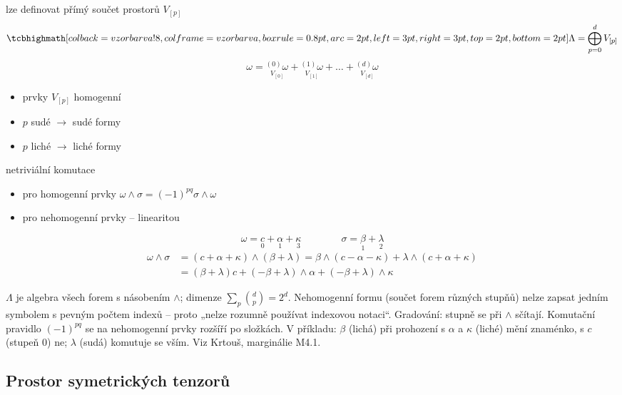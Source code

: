 lze definovat přímý součet prostorů $V_{[p]}$
\[
  \vzorec{\Lambda = \bigoplus_{p=0}^d V_{[p]}}
\]
\[
  \omega = \underset{V_{[0]}}{{}^{(0)}\omega} + \underset{V_{[1]}}{{}^{(1)}\omega} + \dots + \underset{V_{[d]}}{{}^{(d)}\omega}
\]

\begin{itemize}[nosep]
  \item[] prvky $V_{[p]}$ homogenní
  \item[] $p$ sudé $\to$ sudé formy
  \item[] $p$ liché $\to$ liché formy
\end{itemize}
netriviální komutace
\begin{itemize}[nosep]
  \item[] pro homogenní prvky \quad $\omega\wedge\sigma = (-1)^{pq}\sigma\wedge\omega$
  \item[] pro nehomogenní prvky -- linearitou
\end{itemize}

\begin{priklad}[Př.]
\[
  \omega = \underset{0}{c} + \underset{1}{\alpha} + \underset{3}{\kappa} \qquad\qquad
  \sigma = \underset{1}{\beta} + \underset{2}{\lambda}
\]
\begin{align*}
  \omega\wedge\sigma &= (c + \alpha + \kappa)\wedge(\beta + \lambda) = \beta\wedge(c - \alpha - \kappa) + \lambda\wedge(c + \alpha + \kappa) \\
  &= (\beta + \lambda)c + (-\beta + \lambda)\wedge\alpha + (-\beta + \lambda)\wedge\kappa
\end{align*}
\end{priklad}

\begin{vysvetleni}
$\Lambda$ je algebra všech forem s násobením $\wedge$; dimenze $\sum_p\binom dp=2^d$. Nehomogenní formu (součet forem různých stupňů) nelze zapsat jedním symbolem s pevným počtem indexů -- proto „nelze rozumně používat indexovou notaci“.
Gradování: stupně se při $\wedge$ sčítají. Komutační pravidlo $(-1)^{pq}$ se na nehomogenní prvky rozšíří po složkách. V příkladu: $\beta$ (lichá) při prohození s $\alpha$ a $\kappa$ (liché) mění znaménko, s $c$ (stupeň 0) ne; $\lambda$ (sudá) komutuje se vším.
Viz Krtouš, marginálie M4.1.
\end{vysvetleni}

\subsection{Prostor symetrických tenzorů}

